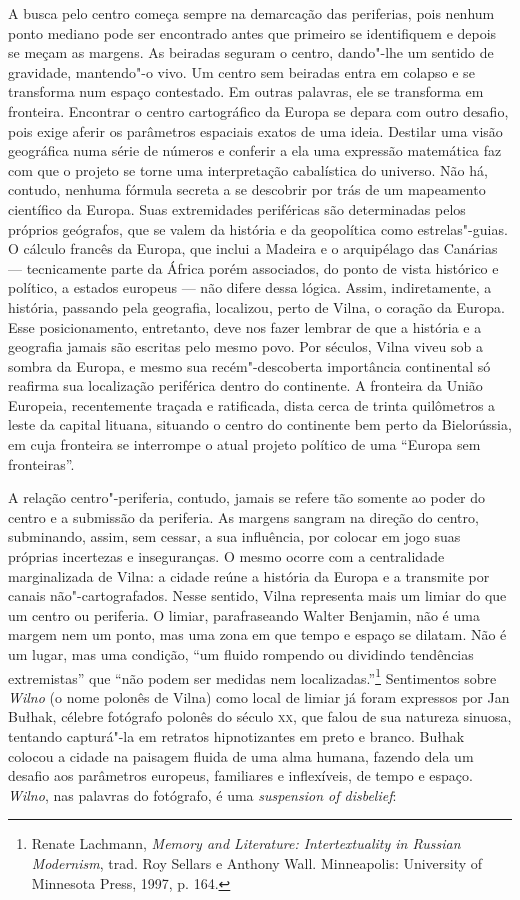 A busca pelo centro começa sempre na demarcação das periferias, pois
nenhum ponto mediano pode ser encontrado antes que primeiro se
identifiquem e depois se meçam as margens. As beiradas seguram o centro,
dando"-lhe um sentido de gravidade, mantendo"-o vivo. Um centro sem
beiradas entra em colapso e se transforma num espaço contestado. Em
outras palavras, ele se transforma em fronteira. Encontrar o centro
cartográfico da Europa se depara com outro desafio, pois exige aferir os
parâmetros espaciais exatos de uma ideia. Destilar uma visão geográfica
numa série de números e conferir a ela uma expressão matemática faz com
que o projeto se torne uma interpretação cabalística do universo. Não
há, contudo, nenhuma fórmula secreta a se descobrir por trás de um
mapeamento científico da Europa. Suas extremidades periféricas são
determinadas pelos próprios geógrafos, que se valem da história e da
geopolítica como estrelas"-guias. O cálculo francês da Europa, que inclui
a Madeira e o arquipélago das Canárias --- tecnicamente parte da África
porém associados, do ponto de vista histórico e político, a estados
europeus --- não difere dessa lógica. Assim, indiretamente, a história,
passando pela geografia, localizou, perto de Vilna, o coração da Europa.
Esse posicionamento, entretanto, deve nos fazer lembrar de que a
história e a geografia jamais são escritas pelo mesmo povo. Por séculos,
Vilna viveu sob a sombra da Europa, e mesmo sua recém"-descoberta
importância continental só reafirma sua localização periférica dentro do
continente. A fronteira da União Europeia, recentemente traçada e
ratificada, dista cerca de trinta quilômetros a leste da capital
lituana, situando o centro do continente bem perto da Bielorússia, em
cuja fronteira se interrompe o atual projeto político de uma ``Europa
sem fronteiras''.

A relação centro"-periferia, contudo, jamais se refere tão somente ao
poder do centro e a submissão da periferia. As margens sangram na
direção do centro, subminando, assim, sem cessar, a sua influência, por
colocar em jogo suas próprias incertezas e inseguranças. O mesmo ocorre
com a centralidade marginalizada de Vilna: a cidade reúne a história da
Europa e a transmite por canais não"-cartografados. Nesse sentido, Vilna
representa mais um limiar do que um centro ou periferia. O limiar,
parafraseando Walter Benjamin, não é uma margem nem um ponto, mas uma
zona em que tempo e espaço se dilatam. Não é um lugar, mas uma condição,
``um fluido rompendo ou dividindo tendências extremistas'' que ``não
podem ser medidas nem localizadas.''\footnote{Renate Lachmann, \textit{Memory and Literature: Intertextuality in Russian Modernism}, trad. Roy Sellars e Anthony Wall. Minneapolis: University of Minnesota Press, 1997, p. 164.} Sentimentos sobre \textit{Wilno} (o nome polonês de Vilna) como local de limiar já foram expressos por Jan Bułhak,
célebre fotógrafo polonês do século \textsc{xx}, que falou de sua natureza
sinuosa, tentando capturá"-la em retratos hipnotizantes em preto e
branco. Bułhak colocou a cidade na paisagem fluida de uma alma humana,
fazendo dela um desafio aos parâmetros europeus, familiares e
inflexíveis, de tempo e espaço. \textit{Wilno}, nas palavras do fotógrafo, é uma
\textit{suspension of disbelief}:

